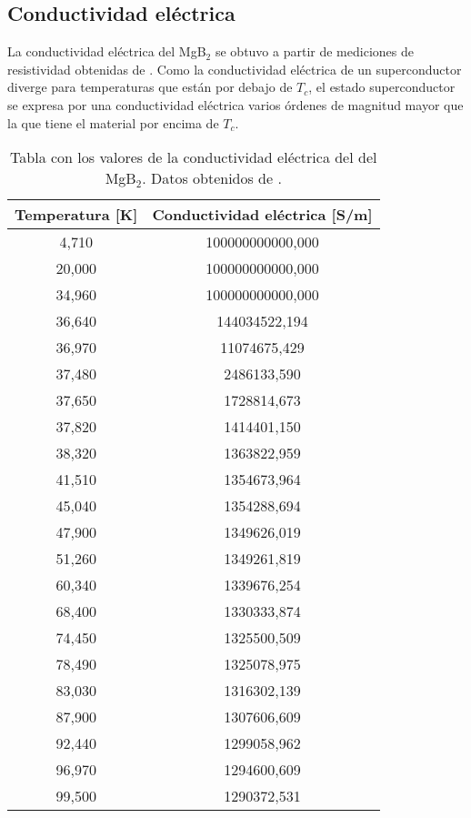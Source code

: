 \subsection*{Conductividad eléctrica}
La conductividad eléctrica del MgB$_2$ se obtuvo a partir de mediciones de resistividad obtenidas de \cite{Nagamatsu2001}. Como la conductividad eléctrica de un superconductor diverge para temperaturas que están por debajo de $T_c$, el estado superconductor se expresa por una conductividad eléctrica varios órdenes de magnitud mayor que la que tiene el material por encima de $T_c$.
\begin{table}[h!]
  \centering
  \begin{tabular}{|c|c|}\hline
	Temperatura [K]	&	Conductividad eléctrica [S/m]	\\ \hline
	4,710	&	100000000000,000	\\
	20,000	&	100000000000,000	\\
	34,960	&	100000000000,000	\\
	36,640	&	144034522,194	\\
	36,970	&	11074675,429	\\
	37,480	&	2486133,590	\\
	37,650	&	1728814,673	\\
	37,820	&	1414401,150	\\
	38,320	&	1363822,959	\\
	41,510	&	1354673,964	\\
	45,040	&	1354288,694	\\
	47,900	&	1349626,019	\\
	51,260	&	1349261,819	\\
	60,340	&	1339676,254	\\
	68,400	&	1330333,874	\\
	74,450	&	1325500,509	\\
	78,490	&	1325078,975	\\
	83,030	&	1316302,139	\\
	87,900	&	1307606,609	\\
	92,440	&	1299058,962	\\
	96,970	&	1294600,609	\\
	99,500	&	1290372,531	\\ \hline
  \end{tabular}
  \caption[Tabla con los valores de la conductividad eléctrica del del MgB$_2$.]{Tabla con los valores de la conductividad eléctrica del del MgB$_2$. Datos obtenidos de \cite{Nagamatsu2001}.}
  \label{tab:smgb2}
\end{table}
\newpage
